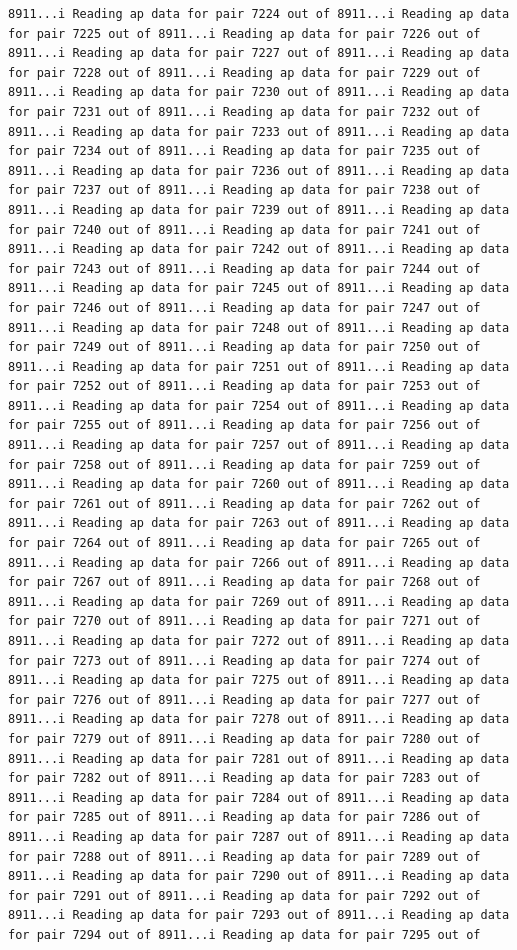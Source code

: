 \documentclass[
]{article}
\begin{document}
\begin{verbatim}
8911...i Reading ap data for pair 7224 out of 8911...i Reading ap data for pair 7225 out of 8911...i Reading ap data for pair 7226 out of 8911...i Reading ap data for pair 7227 out of 8911...i Reading ap data for pair 7228 out of 8911...i Reading ap data for pair 7229 out of 8911...i Reading ap data for pair 7230 out of 8911...i Reading ap data for pair 7231 out of 8911...i Reading ap data for pair 7232 out of 8911...i Reading ap data for pair 7233 out of 8911...i Reading ap data for pair 7234 out of 8911...i Reading ap data for pair 7235 out of 8911...i Reading ap data for pair 7236 out of 8911...i Reading ap data for pair 7237 out of 8911...i Reading ap data for pair 7238 out of 8911...i Reading ap data for pair 7239 out of 8911...i Reading ap data for pair 7240 out of 8911...i Reading ap data for pair 7241 out of 8911...i Reading ap data for pair 7242 out of 8911...i Reading ap data for pair 7243 out of 8911...i Reading ap data for pair 7244 out of 8911...i Reading ap data for pair 7245 out of 8911...i Reading ap data for pair 7246 out of 8911...i Reading ap data for pair 7247 out of 8911...i Reading ap data for pair 7248 out of 8911...i Reading ap data for pair 7249 out of 8911...i Reading ap data for pair 7250 out of 8911...i Reading ap data for pair 7251 out of 8911...i Reading ap data for pair 7252 out of 8911...i Reading ap data for pair 7253 out of 8911...i Reading ap data for pair 7254 out of 8911...i Reading ap data for pair 7255 out of 8911...i Reading ap data for pair 7256 out of 8911...i Reading ap data for pair 7257 out of 8911...i Reading ap data for pair 7258 out of 8911...i Reading ap data for pair 7259 out of 8911...i Reading ap data for pair 7260 out of 8911...i Reading ap data for pair 7261 out of 8911...i Reading ap data for pair 7262 out of 8911...i Reading ap data for pair 7263 out of 8911...i Reading ap data for pair 7264 out of 8911...i Reading ap data for pair 7265 out of 8911...i Reading ap data for pair 7266 out of 8911...i Reading ap data for pair 7267 out of 8911...i Reading ap data for pair 7268 out of 8911...i Reading ap data for pair 7269 out of 8911...i Reading ap data for pair 7270 out of 8911...i Reading ap data for pair 7271 out of 8911...i Reading ap data for pair 7272 out of 8911...i Reading ap data for pair 7273 out of 8911...i Reading ap data for pair 7274 out of 8911...i Reading ap data for pair 7275 out of 8911...i Reading ap data for pair 7276 out of 8911...i Reading ap data for pair 7277 out of 8911...i Reading ap data for pair 7278 out of 8911...i Reading ap data for pair 7279 out of 8911...i Reading ap data for pair 7280 out of 8911...i Reading ap data for pair 7281 out of 8911...i Reading ap data for pair 7282 out of 8911...i Reading ap data for pair 7283 out of 8911...i Reading ap data for pair 7284 out of 8911...i Reading ap data for pair 7285 out of 8911...i Reading ap data for pair 7286 out of 8911...i Reading ap data for pair 7287 out of 8911...i Reading ap data for pair 7288 out of 8911...i Reading ap data for pair 7289 out of 8911...i Reading ap data for pair 7290 out of 8911...i Reading ap data for pair 7291 out of 8911...i Reading ap data for pair 7292 out of 8911...i Reading ap data for pair 7293 out of 8911...i Reading ap data for pair 7294 out of 8911...i Reading ap data for pair 7295 out of 
\end{verbatim}
\end{document}
